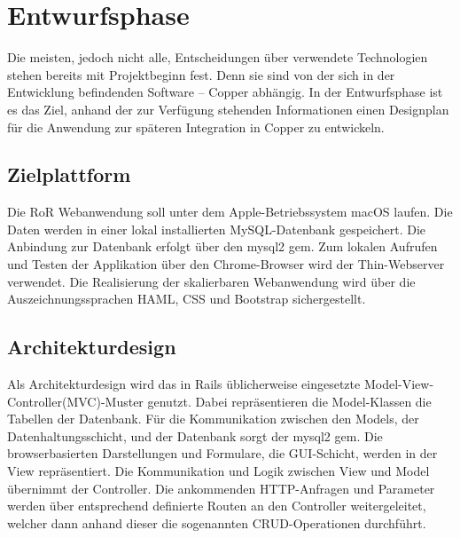 \section{Entwurfsphase} 
\label{sec:Entwurfsphase}
Die meisten, jedoch nicht alle, Entscheidungen über verwendete Technologien stehen bereits mit Projektbeginn fest. Denn sie sind von der sich in der Entwicklung befindenden Software – Copper abhängig. In der Entwurfsphase ist es das Ziel, anhand der zur Verfügung stehenden Informationen einen Designplan für die Anwendung zur späteren Integration in Copper zu entwickeln.

\subsection{Zielplattform}
\label{sec:Zielplattform}
Die \ac{RoR} Webanwendung soll unter dem Apple-Betriebssystem macOS laufen. Die Daten werden in einer lokal installierten \acs{MySQL}-Datenbank gespeichert. Die Anbindung zur Datenbank erfolgt über den \acs{mysql2} \acs{gem}. Zum lokalen Aufrufen und Testen der Applikation über den Chrome-Browser wird der Thin-Webserver verwendet. Die Realisierung der skalierbaren Webanwendung wird über die Auszeichnungssprachen \acs{HAML}, \acs{CSS} und \acs{Bootstrap} sichergestellt.

\subsection{Architekturdesign}
\label{sec:Architekturdesign}
Als Architekturdesign wird das in \acs{Rails} üblicherweise eingesetzte Model-View-Controller(\acs{MVC})-Muster genutzt. Dabei repräsentieren die \acs{Model}-Klassen die Tabellen der Datenbank. Für die Kommunikation zwischen den \acs{Model}s, der Datenhaltungsschicht, und der Datenbank sorgt der \acs{mysql2} \acs{gem}. Die browserbasierten Darstellungen und Formulare, die \acs{GUI}-Schicht, werden in der \acs{View} repräsentiert. Die Kommunikation und Logik zwischen \acs{View} und \acs{Model} übernimmt der \acs{Controller}. Die ankommenden \acs{HTTP}-Anfragen und Parameter werden über entsprechend definierte Routen an den \acs{Controller} weitergeleitet, welcher dann anhand dieser die sogenannten \ac{CRUD}-Operationen durchführt.

